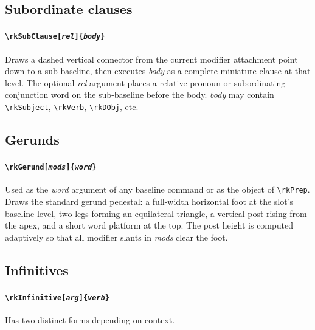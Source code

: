 \documentclass[11pt]{article}
\newcommand{\cmd}[1]{\texttt{\textbackslash #1}}
\begin{document}
\subsection*{Subordinate clauses}

\paragraph{\cmd{rkSubClause[\textit{rel}]\{\textit{body}\}}}
Draws a dashed vertical connector from the current modifier attachment
point down to a sub-baseline, then executes \textit{body} as a complete
miniature clause at that level.  The optional \textit{rel} argument places
a relative pronoun or subordinating conjunction word on the sub-baseline
before the body.  \textit{body} may contain \cmd{rkSubject}, \cmd{rkVerb},
\cmd{rkDObj}, etc.

\subsection*{Gerunds}

\paragraph{\cmd{rkGerund[\textit{mods}]\{\textit{word}\}}}
Used as the \textit{word} argument of any baseline command or as the object
of \cmd{rkPrep}.  Draws the standard gerund pedestal: a full-width
horizontal foot at the slot's baseline level, two legs forming an
equilateral triangle, a vertical post rising from the apex, and a short
word platform at the top.  The post height is computed adaptively so that
all modifier slants in \textit{mods} clear the foot.

\subsection*{Infinitives}

\paragraph{\cmd{rkInfinitive[\textit{arg}]\{\textit{verb}\}}}
Has two distinct forms depending on context.
\end{document}
